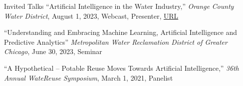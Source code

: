 \documentclass{resume} %
\begin{document}
{\begin{rSection}{Invited Talks}
``Artificial Intelligence in the Water Industry,'' \emph{Orange County Water District}, August 1, 2023, Webcast, Presenter, \href{https://www.youtube.com/watch?v=M3AQTs5iN5g&list=PLUMrNJO9gBM-7WWzJmBveXSQWbOXrLBDg}{URL}

``Understanding and Embracing Machine Learning, Artificial Intelligence and Predictive Analytics'' \emph{Metropolitan Water Reclamation District of Greater Chicago}, June 30, 2023, Seminar

``A Hypothetical – Potable Reuse Moves Towards Artificial Intelligence,'' \emph{36th Annual WateReuse Symposium}, March 1, 2021, Panelist

\end{rSection}

}
\end{document}
